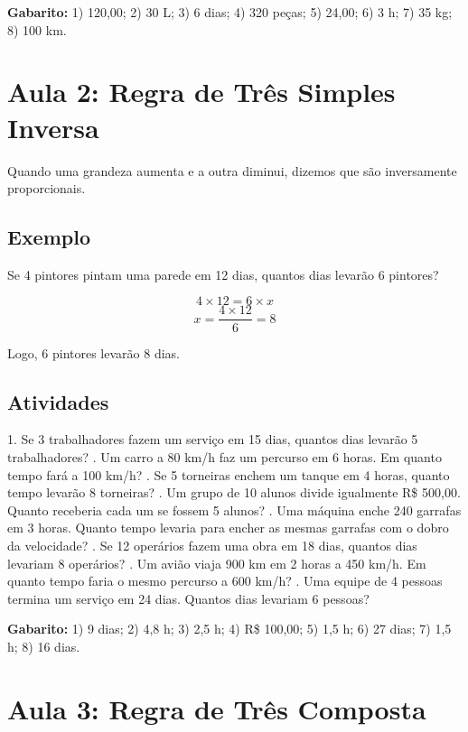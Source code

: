 \documentclass[a4paper,12pt]{article}
\begin{document}
\textbf{Gabarito:} 1) 120,00; 2) 30 L; 3) 6 dias; 4) 320 peças; 5) 24,00; 6) 3 h; 7) 35 kg; 8) 100 km.

\section{Aula 2: Regra de Três Simples Inversa}

Quando uma grandeza aumenta e a outra diminui, dizemos que são inversamente proporcionais.

\subsection*{Exemplo}
Se 4 pintores pintam uma parede em 12 dias, quantos dias levarão 6 pintores?

\[ 4 \times 12 = 6 \times x \]
\[ x = \frac{4 \times 12}{6} = 8 \]

Logo, 6 pintores levarão 8 dias.

\subsection*{Atividades}

1. Se 3 trabalhadores fazem um serviço em 15 dias, quantos dias levarão 5 trabalhadores? . Um carro a 80 km/h faz um percurso em 6 horas. Em quanto tempo fará a 100 km/h? . Se 5 torneiras enchem um tanque em 4 horas, quanto tempo levarão 8 torneiras? . Um grupo de 10 alunos divide igualmente R\$ 500,00. Quanto receberia cada um se fossem 5 alunos? . Uma máquina enche 240 garrafas em 3 horas. Quanto tempo levaria para encher as mesmas garrafas com o dobro da velocidade? . Se 12 operários fazem uma obra em 18 dias, quantos dias levariam 8 operários? . Um avião viaja 900 km em 2 horas a 450 km/h. Em quanto tempo faria o mesmo percurso a 600 km/h? . Uma equipe de 4 pessoas termina um serviço em 24 dias. Quantos dias levariam 6 pessoas? \newline

\textbf{Gabarito:} 1) 9 dias; 2) 4,8 h; 3) 2,5 h; 4) R\$ 100,00; 5) 1,5 h; 6) 27 dias; 7) 1,5 h; 8) 16 dias.

\section{Aula 3: Regra de Três Composta}
\end{document}
